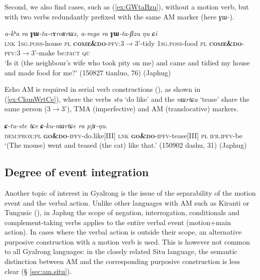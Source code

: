 \documentclass[oneside,a4paper,11pt]{article}
\newcommand{\ipa}[1]{{\phon\textit{#1}}}
\newcommand{\forme}[1]{\textit{\phon#1}}
\newcommand{\japhug}[2]{\textit{\phon#1} `#2'}
\newcommand{\rouge}[1]{\textbf{#1}}
\begin{document}
Second, we also find cases, such as (\ref{ex:GWtaBzu}), without a motion verb, but with two verbs redundantly prefixed with the same AM marker (here \forme{ɣɯ-}).

\begin{exe}
\ex \label{ex:GWtaBzu}
\gll \ipa{tɕe}	\ipa{a-kʰa}	\ipa{ra}	\ipa{\rouge{ɣɯ}-ta-rɤroʁrɯz,}	\ipa{a-mgo}	\ipa{ra}	\ipa{\rouge{ɣɯ}-ta-βzu}	\ipa{ŋu}	\ipa{ɕi} \\
\textsc{lnk} \textsc{1sg}.\textsc{poss}-house \textsc{pl} \rouge{\textsc{come\&do}}-\textsc{pfv}:3$\rightarrow$3'-tidy 
 \textsc{1sg}.\textsc{poss}-food \textsc{pl} \rouge{\textsc{come\&do}}-\textsc{pfv}:3$\rightarrow$3'-make be:\textsc{fact} \textsc{qu} \\ 
\glt `Is it (the neighbour's wife who took pity on me) and came and tidied my house and made food for me?'  (150827 tianluo, 76) (Japhug)
\end{exe}


Echo AM is required in serial verb constructions (\citealt[253-255]{jacques16complementation}), as shown in (\ref{ex:CkunWrtCe}), where the verbs \japhug{stu}{do like} and the \japhug{nɯrtɕa}{tease} share the same person (3$\rightarrow$3'), TMA (imperfective) and AM (translocative) markers.

\begin{exe}
\ex \label{ex:CkunWrtCe}
\gll \ipa{kɯra}	\ipa{\rouge{ɕ}-tu-ste}	\ipa{tɕe}	\ipa{\rouge{ɕ}-ku-nɯrtɕe}	\ipa{ra}	\ipa{pjɤ-ŋu.} \\
\textsc{dem}:\textsc{prox}:\textsc{pl} \rouge{\textsc{go\&do}}-\textsc{ipfv}-do.like[III] \textsc{lnk}  \rouge{\textsc{go\&do}}-\textsc{ipfv}-tease[III] \textsc{pl} \textsc{ifr}.\textsc{ipfv}-be \\
\glt `(The mouse) went and teased (the cat) like that.' (150902 dashu, 31) (Japhug)
\end{exe}


 \subsection{Degree of event integration} \label{sec:am.japhug}
Another topic of interest in Gyalrong is the issue of the separability of the motion event and the verbal action. Unlike other languages with AM such as Kiranti or Tungusic (\citealt{stojnova16nda, fuente18am}), in Japhug the scope of negation, interrogation, conditionals and complement-taking verbs applies to the entire verbal event (motion+main action). In cases where the verbal action is outside their scope, an alternative purposive construction with a motion verb is used. This is however not common to all Gyalrong languages: in the closely related Situ language, the semantic distinction between AM and the corresponding purposive construction is less clear (§ \ref{sec:am.situ}). 
 
\end{document}
